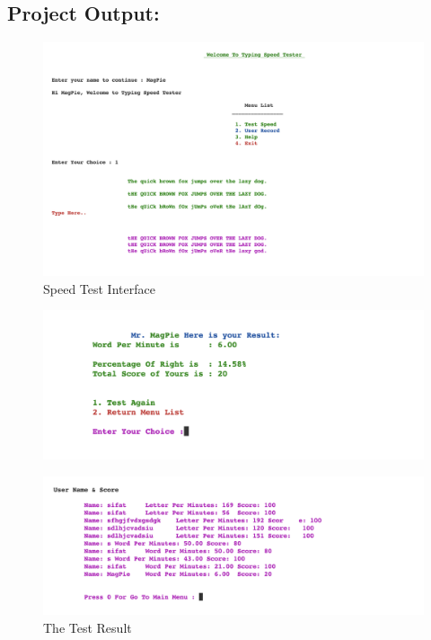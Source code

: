 \subsection{Project Output:}

\begin{figure}[h]
     \includegraphics[scale=1,width=\textwidth]{CodeScreenShot/MagPie1.png}
    \caption{Speed Test Interface}
    \label{fig:code-screenshots}
\end{figure}
\begin{figure}[h]
     \includegraphics[scale=1,width=\textwidth]{CodeScreenShot/MagPie2.png}
    \label{fig:code-screenshots}
\end{figure}
\begin{figure}[h]
     \includegraphics[scale=1,width=\textwidth]{CodeScreenShot/UserRecord.png}
    \caption{The Test Result}
    \label{fig:code-screenshots}
\end{figure}
